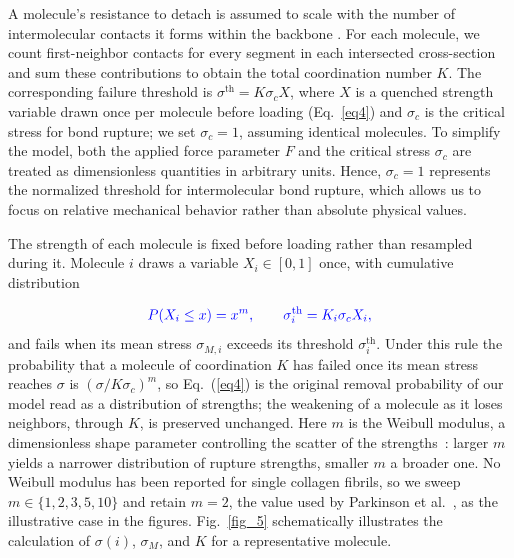 \documentclass[aps,physrev,preprint,groupedaddress,linenumbers]{revtex4-2}
\newcommand{\rev}[1]{{\color{blue}#1}}
\begin{document}
A molecule's resistance to detach is assumed to scale with the number of intermolecular contacts it forms within the backbone \cite{Vater1979}. For each molecule, we count first-neighbor contacts for every segment in each intersected cross-section and sum these contributions to obtain the total coordination number $K$. The corresponding failure threshold is \rev{$\sigma^{\mathrm{th}} = K\sigma_c X$, where $X$ is a quenched strength variable drawn once per molecule before loading (Eq.~\ref{eq4}) and} $\sigma_c$ is the critical stress for bond rupture; we set $\sigma_c = 1$, assuming identical molecules. To simplify the model, both the applied force parameter $F$ and the critical stress $\sigma_c$ are treated as dimensionless quantities in arbitrary units. Hence, $\sigma_c = 1$ represents the normalized threshold for intermolecular bond rupture, which allows us to focus on relative mechanical behavior rather than absolute physical values.

\rev{The strength of each molecule is fixed before loading rather than resampled during it. Molecule $i$ draws a variable $X_i \in [0,1]$ once, with cumulative distribution}

\begin{equation}
	\rev{P(X_i \le x) = x^{m}, \qquad \sigma^{\mathrm{th}}_{i} = K_i \sigma_c X_i,}
	\label{eq4}
\end{equation}
\rev{and fails when its mean stress $\sigma_{M,i}$ exceeds its threshold $\sigma^{\mathrm{th}}_{i}$. Under this rule the probability that a molecule of coordination $K$ has failed once its mean stress reaches $\sigma$ is $(\sigma/K\sigma_c)^{m}$, so Eq.~(\ref{eq4}) is the original removal probability of our model read as a distribution of strengths; the weakening of a molecule as it loses neighbors, through $K$, is preserved unchanged. Here $m$ is the Weibull modulus, a dimensionless shape parameter controlling the scatter of the strengths~\cite{Parkinson1997,Jones2012}: larger $m$ yields a narrower distribution of rupture strengths, smaller $m$ a broader one. No Weibull modulus has been reported for single collagen fibrils, so we sweep $m \in \{1,2,3,5,10\}$ and retain $m = 2$, the value used by Parkinson et al.~\cite{Parkinson1997}, as the illustrative case in the figures.} Fig.~\ref{fig_5} schematically illustrates the calculation of $\sigma(i)$, $\sigma_{M}$, and $K$ for a representative molecule.
\end{document}
